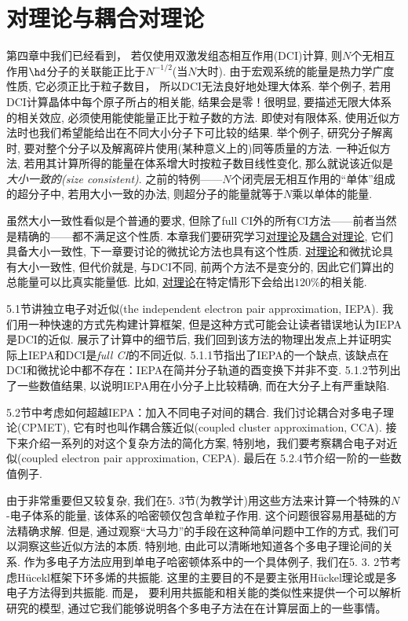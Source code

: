 \chapter{对理论与耦合对理论}
第四章中我们已经看到，
若仅使用双激发组态相互作用(DCI)计算, 
则$N$个无相互作用$\hd$分子的关联能正比于$N^{-1/2}$(当$N$大时). 
由于宏观系统的能量是热力学广度性质, 
它必须正比于粒子数目，
所以DCI无法良好地处理大体系. 
举个例子, 
若用DCI计算晶体中每个原子所占的相关能, 
结果会是零！很明显, 
要描述无限大体系的相关效应, 
必须使用能使能量正比于粒子数的方法. 
即使对有限体系, 
使用近似方法时也我们希望能给出在不同大小分子下可比较的结果. 
举个例子, 
研究分子解离时, 
要对整个分子以及解离碎片使用(某种意义上的)同等质量的方法. 
一种近似方法, 
若用其计算所得的能量在体系增大时按粒子数目线性变化, 
那么就说该近似是\emph{大小一致的(size consistent)}. 
之前的特例——$N$个闭壳层无相互作用的``单体''组成的超分子中, 
若用大小一致的办法, 
则超分子的能量就等于$N$乘以单体的能量.


虽然大小一致性看似是个普通的要求, 
但除了full CI外的所有CI方法——前者当然是精确的——都不满足这个性质. 
本章我们要研究学习\underline{对理论}及\underline{耦合对理论}, 
它们具备大小一致性, 
下一章要讨论的微扰论方法也具有这个性质. 
\underline{对理论}和微扰论具有大小一致性, 
但代价就是, 
与DCI不同, 前两个方法不是变分的, 
因此它们算出的总能量可以比真实能量低. 
比如, \underline{对理论}在特定情形下会给出$120\%$的相关能.


5.1节讲独立电子对近似(the independent electron pair approximation, IEPA). 我们用一种快速的方式先构建计算框架, 但是这种方式可能会让读者错误地认为IEPA是DCI的近似. 展示了计算中的细节后, 我们回到该方法的物理出发点上并证明实际上IEPA和DCI是\emph{full CI}的不同近似. 5.1.1节指出了IEPA的一个缺点, 该缺点在DCI和微扰论中都不存在：IEPA在简并分子轨道的酉变换下并非不变. 5.1.2节列出了一些数值结果, 以说明IEPA用在小分子上比较精确, 而在大分子上有严重缺陷.

5.2节中考虑如何超越IEPA：加入不同电子对间的耦合. 我们讨论耦合对多电子理论(CPMET), 它有时也叫作耦合簇近似(coupled cluster approximation, CCA). 接下来介绍一系列的对这个复杂方法的简化方案, 特别地，我们要考察耦合电子对近似(coupled electron pair approximation, CEPA). 最后在 5.2.4节介绍一阶的一些数值例子.

由于非常重要但又较复杂, 
我们在5.
3节(为教学计)用这些方法来计算一个特殊的$N$-电子体系的能量, 
该体系的哈密顿仅包含单粒子作用. 
这个问题很容易用基础的方法精确求解. 
但是, 
通过观察``大马力''的手段在这种简单问题中工作的方式, 
我们可以洞察这些近似方法的本质. 
特别地, 
由此可以清晰地知道各个多电子理论间的关系. 
作为多电子方法应用到单电子哈密顿体系中的一个具体例子, 
我们在5.
3.
2节考虑H\"ucekl框架下环多烯的共振能. 
这里的主要目的不是要主张用H\"uckel理论或是多电子方法得到共振能. 
而是，
要利用共振能和相关能的类似性来提供一个可以解析研究的模型, 
通过它我们能够说明各个多电子方法在在计算层面上的一些事情。


